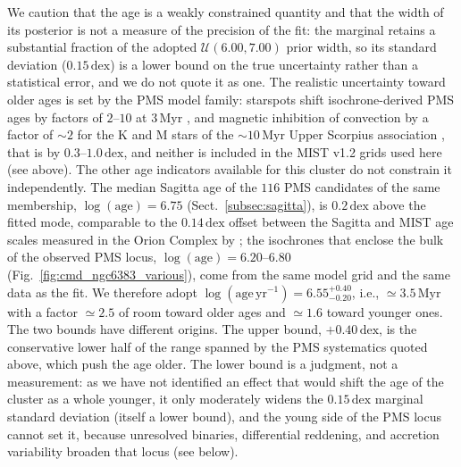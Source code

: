 \documentclass{aa}
\begin{document}
We caution that the age is a weakly constrained quantity and that the width of its posterior is not a measure of the precision of the fit: the marginal retains a substantial fraction of the adopted $\mathcal{U}(6.00,7.00)$ prior width, so its standard deviation ($0.15\,\mathrm{dex}$) is a lower bound on the true uncertainty rather than a statistical error, and we do not quote it as one. The realistic uncertainty toward older ages is set by the PMS model family: starspots shift isochrone-derived PMS ages by factors of $2$--$10$ at $3\,\mathrm{Myr}$ \citep{2015ApJ...807..174S}, and magnetic inhibition of convection by a factor of $\sim2$ for the K and M stars of the $\sim10\,\mathrm{Myr}$ Upper Scorpius association \citep{2016A&A...593A..99F}, that is by $0.3$--$1.0\,\mathrm{dex}$, and neither is included in the MIST v1.2 grids used here (see above). The other age indicators available for this cluster do not constrain it independently. The median Sagitta age of the $116$ PMS candidates of the same membership, $\log(\mathrm{age})=6.75$ (Sect.~\ref{subsec:sagitta}), is $0.2\,\mathrm{dex}$ above the fitted mode, comparable to the $0.14\,\mathrm{dex}$ offset between the Sagitta and MIST age scales measured in the Orion Complex by \citet{2023AJ....165..182K}; the isochrones that enclose the bulk of the observed PMS locus, $\log(\mathrm{age})=6.20$--$6.80$ (Fig.~\ref{fig:cmd_ngc6383_various}), come from the same model grid and the same data as the fit. We therefore adopt $\log(\mathrm{age}\,\mathrm{yr^{-1}}) = 6.55^{+0.40}_{-0.20}$, i.e., $\simeq3.5\,\mathrm{Myr}$ with a factor $\simeq2.5$ of room toward older ages and $\simeq1.6$ toward younger ones. The two bounds have different origins. The upper bound, $+0.40\,\mathrm{dex}$, is the conservative lower half of the range spanned by the PMS systematics quoted above, which push the age older. The lower bound is a judgment, not a measurement: as we have not identified an effect that would shift the age of the cluster as a whole younger, it only moderately widens the $0.15\,\mathrm{dex}$ marginal standard deviation (itself a lower bound), and the young side of the PMS locus cannot set it, because unresolved binaries, differential reddening, and accretion variability broaden that locus (see below).
\end{document}
